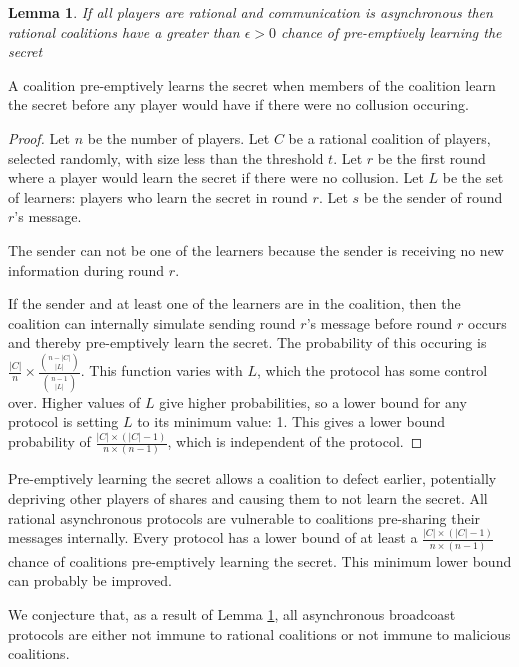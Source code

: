 \documentclass{dalcsthesis}
\newtheorem{lemma}{Lemma}
\begin{document}
\begin{lemma} If all players are rational and communication is asynchronous then rational coalitions have a greater than $\epsilon > 0$ chance of pre-emptively learning the secret \label{Lem:Async:CoalitionsMayPreempt} \end{lemma}

A coalition pre-emptively learns the secret when members of the coalition learn the secret before any player would have if there were no collusion occuring.

\begin{proof}
Let $n$ be the number of players.
Let $C$ be a rational coalition of players, selected randomly, with size less than the threshold $t$.
Let $r$ be the first round where a player would learn the secret if there were no collusion.
Let $L$ be the set of learners: players who learn the secret in round $r$.
Let $s$ be the sender of round $r$'s message.

The sender can not be one of the learners because the sender is receiving no new information during round $r$.

If the sender and at least one of the learners are in the coalition, then the coalition can internally simulate sending round $r$'s message before round $r$ occurs and thereby pre-emptively learn the secret. The probability of this occuring is $\frac{|C|}{n} \times \frac{\binom{n - |C|}{|L|}}{\binom{n - 1}{|L|}}$. This function varies with $L$, which the protocol has some control over. Higher values of $L$ give higher probabilities, so a lower bound for any protocol is setting $L$ to its minimum value: 1. This gives a lower bound probability of $\frac{|C| \times (|C| - 1)}{n \times (n-1)}$, which is independent of the protocol.
\end{proof}

Pre-emptively learning the secret allows a coalition to defect earlier, potentially depriving other players of shares and causing them to not learn the secret. All rational asynchronous protocols are vulnerable to coalitions pre-sharing their messages internally. Every protocol has a lower bound of at least a $\frac{|C| \times (|C| - 1)}{n \times (n-1)}$ chance of coalitions pre-emptively learning the secret. This minimum lower bound can probably be improved.

We conjecture that, as a result of Lemma \ref{Lem:Async:CoalitionsMayPreempt}, all asynchronous broadcoast protocols are either not immune to rational coalitions or not immune to malicious coalitions.
\end{document}
